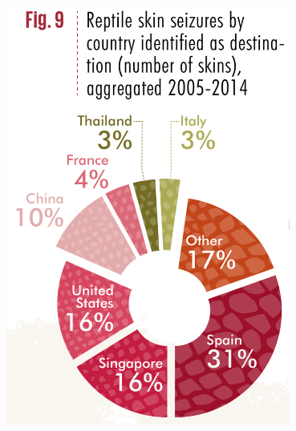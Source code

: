 \documentclass[10pt]{beamer}
\begin{document}
\begin{frame}[t]
\begin{columns}
		\begin{column}{0.5\textwidth}
			\begin{center}
				\includegraphics[width=0.7\textwidth]{figures/fashion_illegal_import.png}
			\end{center}
		\end{column}
	\end{columns}
\end{frame}
\end{document}
